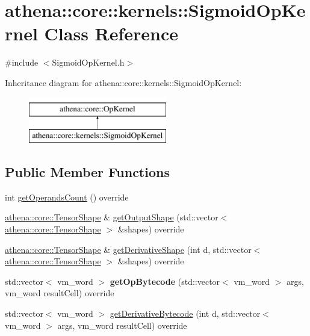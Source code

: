 \hypertarget{classathena_1_1core_1_1kernels_1_1_sigmoid_op_kernel}{}\section{athena\+:\+:core\+:\+:kernels\+:\+:Sigmoid\+Op\+Kernel Class Reference}
\label{classathena_1_1core_1_1kernels_1_1_sigmoid_op_kernel}


{\ttfamily \#include $<$Sigmoid\+Op\+Kernel.\+h$>$}

Inheritance diagram for athena\+:\+:core\+:\+:kernels\+:\+:Sigmoid\+Op\+Kernel\+:\begin{figure}[H]
\begin{center}
\leavevmode
\includegraphics[height=2.000000cm]{d0/dac/classathena_1_1core_1_1kernels_1_1_sigmoid_op_kernel}
\end{center}
\end{figure}
\subsection*{Public Member Functions}
\begin{DoxyCompactItemize}
\item 
int \mbox{\hyperlink{classathena_1_1core_1_1kernels_1_1_sigmoid_op_kernel_acb639510462e759a92747cec8c32358b}{get\+Operands\+Count}} () override
\item 
\mbox{\hyperlink{classathena_1_1core_1_1_tensor_shape}{athena\+::core\+::\+Tensor\+Shape}} \& \mbox{\hyperlink{classathena_1_1core_1_1kernels_1_1_sigmoid_op_kernel_abd929f41de55a4898a0fce70025c1499}{get\+Output\+Shape}} (std\+::vector$<$ \mbox{\hyperlink{classathena_1_1core_1_1_tensor_shape}{athena\+::core\+::\+Tensor\+Shape}} $>$ \&shapes) override
\item 
\mbox{\hyperlink{classathena_1_1core_1_1_tensor_shape}{athena\+::core\+::\+Tensor\+Shape}} \& \mbox{\hyperlink{classathena_1_1core_1_1kernels_1_1_sigmoid_op_kernel_a0ea18b43eb9355d7a855202898ff09fc}{get\+Derivative\+Shape}} (int d, std\+::vector$<$ \mbox{\hyperlink{classathena_1_1core_1_1_tensor_shape}{athena\+::core\+::\+Tensor\+Shape}} $>$ \&shapes) override
\item 
\mbox{\label{classathena_1_1core_1_1kernels_1_1_sigmoid_op_kernel_a728bbcf1fce2ae1173f45119ae0898fc}} 
std\+::vector$<$ vm\+\_\+word $>$ {\bfseries get\+Op\+Bytecode} (std\+::vector$<$ vm\+\_\+word $>$ args, vm\+\_\+word result\+Cell) override
\item 
std\+::vector$<$ vm\+\_\+word $>$ \mbox{\hyperlink{classathena_1_1core_1_1kernels_1_1_sigmoid_op_kernel_a38166ae2204692353efa2f6270714a80}{get\+Derivative\+Bytecode}} (int d, std\+::vector$<$ vm\+\_\+word $>$ args, vm\+\_\+word result\+Cell) override
\end{DoxyCompactItemize}
